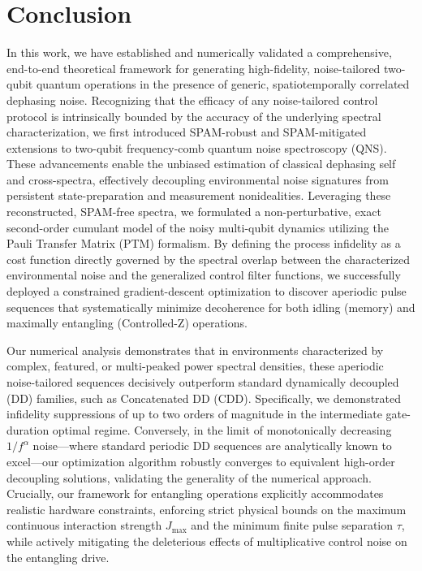 \documentclass[%
 reprint,
superscriptaddress,
 amsmath,amssymb,
 aps,
pra,
floatfix,
]{revtex4-2}
\newcommand{\qk}[1]{{\color{OliveGreen}#1}}
\begin{document}

\section{Conclusion}
\label{sec::conclusion}

In this work, we have established and numerically validated a comprehensive, end-to-end theoretical framework for generating high-fidelity, noise-tailored two-qubit quantum operations in the presence of generic, spatiotemporally correlated dephasing noise. Recognizing that the efficacy of any noise-tailored control protocol is intrinsically bounded by the accuracy of the underlying spectral characterization, we first introduced SPAM-robust and SPAM-mitigated extensions to two-qubit frequency-comb quantum noise spectroscopy (QNS). These advancements enable the unbiased estimation of classical dephasing self and cross-spectra, effectively decoupling environmental noise signatures from persistent state-preparation and measurement nonidealities. Leveraging these reconstructed, SPAM-free spectra, we formulated a non-perturbative, exact second-order cumulant model of the noisy multi-qubit dynamics utilizing the Pauli Transfer Matrix (PTM) formalism. By defining the process infidelity as a cost function directly governed by the spectral overlap between the characterized environmental noise and the generalized control filter functions, we successfully deployed a constrained gradient-descent optimization to discover aperiodic pulse sequences that systematically minimize decoherence for both idling (memory) and maximally entangling (Controlled-Z) operations.

Our numerical analysis demonstrates that in environments characterized by complex, featured, or multi-peaked power spectral densities, these aperiodic noise-tailored sequences decisively outperform standard dynamically decoupled (DD) families, such as Concatenated DD (CDD). Specifically, we demonstrated infidelity suppressions of up to two orders of magnitude in the intermediate gate-duration optimal regime. Conversely, in the limit of monotonically decreasing $1/f^\alpha$ noise—where standard periodic DD sequences are analytically known to excel—our optimization algorithm robustly converges to equivalent high-order decoupling solutions, validating the generality of the numerical approach. Crucially, our framework for entangling operations explicitly accommodates realistic hardware constraints, enforcing strict physical bounds on the maximum continuous interaction strength $J_\text{max}$ and the minimum finite pulse separation $\tau$, while actively mitigating the deleterious effects of multiplicative control noise on the entangling drive.
\end{document}
